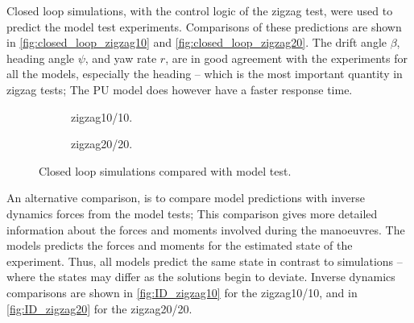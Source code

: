 Closed loop simulations, with the control logic of the zigzag test, were used to predict the model test experiments. Comparisons of these predictions are shown in \autoref{fig:closed_loop_zigzag10} and \autoref{fig:closed_loop_zigzag20}. The drift angle $\beta$, heading angle $\psi$, and yaw rate $r$, are in good agreement with the experiments for all the models, especially the heading -- which is the most important quantity in zigzag tests; The PU model does however have a faster response time.

\begin{figure}
    \centering
    \begin{subfigure}[b]{0.49\textwidth}
        \centering
        
        \caption{zigzag10/10.}
        \label{fig:closed_loop_zigzag10}
    \end{subfigure}
    \hfill
    \begin{subfigure}[b]{0.49\textwidth}
        \centering
        
        \caption{zigzag20/20.}
        \label{fig:closed_loop_zigzag20}
    \end{subfigure}
    \caption{Closed loop simulations compared with model test.}
    \label{fig:vct}
\end{figure}
%    
%    
An alternative comparison, is to compare model predictions with inverse dynamics forces from the model tests; This comparison gives more detailed information about the forces and moments involved during the manoeuvres. The models predicts the forces and moments for the estimated state of the experiment. Thus, all models predict the same state in contrast to simulations -- where the states may differ as the solutions begin to deviate. Inverse dynamics comparisons are shown in \autoref{fig:ID_zigzag10} for the zigzag10/10, and in \autoref{fig:ID_zigzag20} for the zigzag20/20.    
